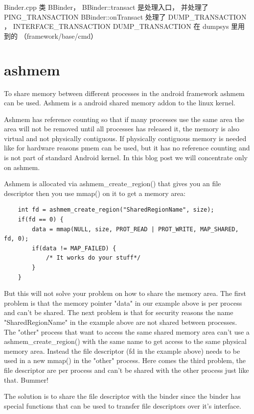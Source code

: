 \documentclass[a4paper,11pt]{article}
\begin{document}
Binder.cpp  类 BBinder，
BBinder::transact 是处理入口， 并处理了  PING_TRANSACTION 
BBinder::onTransact 处理了 DUMP_TRANSACTION ， INTERFACE_TRANSACTION 
DUMP_TRANSACTION 在 dumpsys 里用到的 （framework/base/cmd）



\section{ashmem}
To share memory between different processes in the android framework ashmem
can be used. Ashmem is a android shared memory addon to the linux kernel. 

Ashmem has reference counting so that if many processes use the same area the
area will not be removed until all processes has released it, the memory is
also virtual and not physically contiguous. If physically contiguous memory is
needed like for hardware reasons pmem can be used, but it has no reference
counting and is not part of standard Android kernel. 
In this blog post we will concentrate only on ashmem.

Ashmem is allocated via ashmem_create_region() that gives you an file
descriptor then you use mmap() on it to get a memory area:
\begin{lstlisting}
    int fd = ashmem_create_region("SharedRegionName", size);
    if(fd == 0) {
        data = mmap(NULL, size, PROT_READ | PROT_WRITE, MAP_SHARED, fd, 0);
        if(data != MAP_FAILED) {
            /* It works do your stuff*/
        }
    }
\end{lstlisting}

But this will not solve your problem on how to share the memory area. The
first problem is that the memory pointer "data" in our example above is per
process and can't be shared. The next problem is that for security reasons the
name "SharedRegionName" in the example above are not shared between processes.
The "other" process that want to access the same shared memory area can't use
a ashmem_create_region() with the same name to get access to the same physical
memory area. Instead the file descriptor (fd in the example above) needs to be
used in a new mmap() in the "other" process. Here comes the third problem, the
file descriptor are per process and can't be shared with the other process
just like that. Bummer!

The solution is to share the file descriptor with the binder since the binder
has special functions that can be used to transfer file descriptors over it's
interface.
\end{document}
